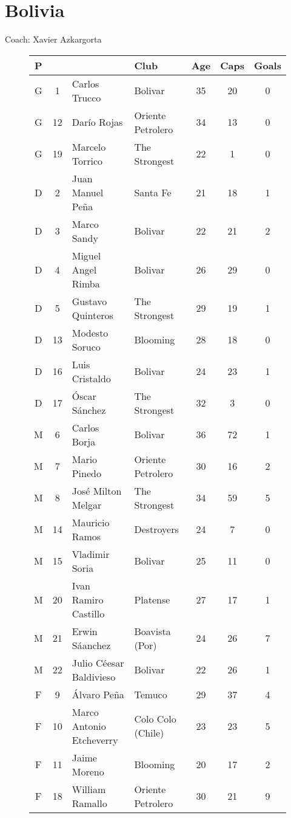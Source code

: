 \chapter{Bolivia}
\newline
\newline
Coach: Xavier Azkargorta
\begin{figure}[H]
\begin{tabular}{c c l l c c c}
P & & & Club & Age & Caps & Goals \\ \hline
G & 1 & Carlos Trucco & Bolivar &  35 & 20 & 0 \\
G & 12 & Dar{\'i}o Rojas & Oriente Petrolero & 34 & 13 & 0 \\
G & 19 & Marcelo Torrico & The Strongest & 22 & 1 & 0 \\ \hline
D & 2 & Juan Manuel Pe{\~n}a & Santa Fe & 21 & 18 & 1 \\
D & 3 & Marco Sandy & Bolivar & 22 & 21 & 2 \\
D & 4 & Miguel Angel Rimba & Bolivar & 26 & 29 & 0 \\
D & 5 & Gustavo Quinteros & The Strongest & 29 & 19 & 1 \\
D & 13 & Modesto Soruco & Blooming & 28 & 18 & 0 \\
D & 16 & Luis Cristaldo & Bolivar & 24 & 23 & 1 \\
D & 17 & {\'O}scar S{\'a}nchez & The Strongest & 32 & 3 & 0 \\ \hline
M & 6 & Carlos Borja & Bolivar & 36 & 72 & 1 \\
M & 7 & Mario Pinedo & Oriente Petrolero & 30 & 16 & 2 \\
M & 8 & Jos{\'e} Milton Melgar & The Strongest & 34 & 59 & 5 \\
M & 14 & Mauricio Ramos & Destroyers & 24 & 7 & 0 \\
M & 15 & Vladimir Soria & Bolivar & 25 & 11 & 0 \\
M & 20 & Ivan Ramiro Castillo & Platense & 27 & 17 & 1 \\
M & 21 & Erwin S{\'a}anchez & Boavista (Por) & 24 & 26 & 7 \\
M & 22 & Julio C{\'e}esar Baldivieso & Bolivar & 22 & 26 & 1 \\ \hline
F & 9 & {\'A}lvaro Pe{\~n}a & Temuco & 29 & 37 & 4 \\
F & 10 & Marco Antonio Etcheverry & Colo Colo (Chile) & 23 & 23 & 5 \\
F & 11 & Jaime Moreno & Blooming & 20 & 17 & 2 \\
F & 18 & William Ramallo & Oriente Petrolero & 30 & 21 & 9 \\ \hline
\end{tabular}
\end{figure}
